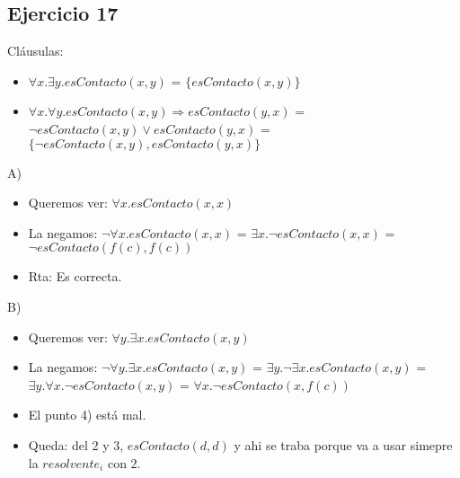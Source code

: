 \documentclass[10pt,a4paper]{article}
\begin{document}
\subsection{Ejercicio 17}
    Cláusulas:
    \begin{itemize}
        \item $\forall x. \exists y. esContacto(x,y)$ = $\{esContacto(x,y)\}$
        \item $\forall x. \forall y. esContacto(x,y) \Rightarrow esContacto(y,x)$ = $\neg esContacto(x,y) \vee esContacto(y,x)$  = $\{ \neg esContacto(x,y), esContacto(y,x)\}$
    \end{itemize}
    A) 
    \begin{itemize}
        \item Queremos ver: $\forall x. esContacto(x,x)$ 
        \item La negamos: $\neg \forall x. esContacto(x,x)$ = $\exists x. \neg esContacto(x,x)$ = $\neg esContacto(f(c),f(c))$
        \item Rta: Es correcta.
    \end{itemize}
    B) 
    \begin{itemize}
        \item Queremos ver: $\forall y. \exists x. esContacto(x,y)$ 
        \item La negamos: $\neg \forall y. \exists x. esContacto(x,y)$ = $\exists y. \neg \exists x. esContacto(x,y)$ = $\exists y. \forall x. \neg esContacto(x,y)$ = $\forall x. \neg esContacto(x,f(c))$  
        \item El punto 4) está mal. 
        \item Queda: del 2 y 3, $esContacto(d,d)$ y ahi se traba porque va a usar simepre la $resolvente_{i}$ con 2.
    \end{itemize}
\end{document}
